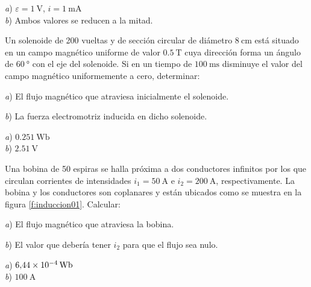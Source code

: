 \begin{Answer}
    \begin{minipage}[t]{.4\textwidth}
        \textit{a}) $\varepsilon = \SI{1}{\volt}$, $i = \SI{1}{\milli\ampere}$\\ \textit{b}) Ambos valores se reducen a la mitad.
    \end{minipage}
\end{Answer}
%
\begin{Exercise}
    Un solenoide de 200 vueltas y de sección circular de diámetro $\SI{8}{\centi\metre}$ está situado en un campo magnético uniforme de valor $\SI{0.5}{\tesla}$ cuya dirección forma un ángulo de $\SI{60}{\degree}$ con el eje del solenoide. Si en un tiempo de $\SI{100}{\milli\second}$ disminuye el valor del campo magnético uniformemente a cero, determinar:\par
    \textit{a}) El flujo magnético que atraviesa inicialmente el solenoide.\par
    \textit{b}) La fuerza electromotriz inducida en dicho solenoide.
\end{Exercise}
\begin{Answer}
    \begin{minipage}[t]{.4\textwidth}
        \textit{a}) $\SI{0.251}{\weber}$\\ \textit{b}) $\SI{2.51}{\volt}$
    \end{minipage}
\end{Answer}
%
\begin{Exercise}\label{p:induccion01}
    Una bobina de 50 espiras se halla próxima a dos conductores infinitos por los que circulan corrientes de intensidades $i_1=\SI{50}{\ampere}$ e $i_2=\SI{200}{\ampere}$, respectivamente. La bobina y los conductores son coplanares y están ubicados como se muestra en la figura \ref{f:induccion01}. Calcular:\par
    \textit{a}) El flujo magnético que atraviesa la bobina.\par
    \textit{b}) El valor que debería tener $i_2$ para que el flujo sea nulo.
\end{Exercise}
\begin{Answer}
    \begin{minipage}[t]{.4\textwidth}
        \textit{a}) $\SI{6.44E-4}{\weber}$\\ \textit{b}) $\SI{100}{\ampere}$
    \end{minipage}
\end{Answer}
%
